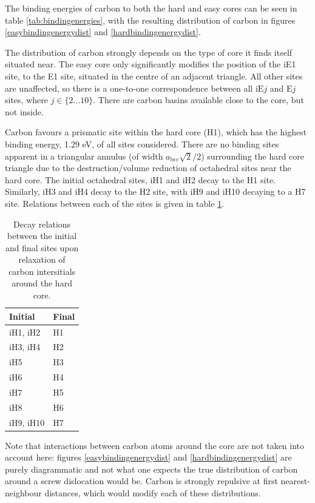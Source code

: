 \documentclass[a4paper,11pt]{article}
\begin{document}
The binding energies of carbon to both the hard and easy cores can be seen in
table \ref{tab:bindingenergies}, with the resulting distribution of carbon in figures \ref{easybindingenergydist} and
\ref{hardbindingenergydist}. 

The distribution of carbon strongly depends on the type of core it
finds itself situated near. The easy core only significantly modifies the position of the iE1 site, to the E1 site, situated
in the centre of an adjacent triangle. All other sites are unaffected, so there is a one-to-one
correspondence between all \(\text{iE}j\) and \(\text{E}j\) sites, where \(j \in \{2\dots10\}\). There are carbon basins available
close to the core, but not inside.

Carbon favours a prismatic site within the hard core (H1), which has the highest
binding energy, 1.29 eV, of all sites considered. There are no binding sites apparent in a triangular
annulus (of width \(a_{\text{bcc}}\sqrt{2}/2\)) surrounding the hard core triangle due to the
destruction/volume reduction of octahedral sites near the hard core. The initial octahedral
sites, iH1 and iH2 decay to the H1 site. Similarly, iH3 and iH4 decay to the H2 site, with iH9
and iH10 decaying to a H7 site. Relations between each of the sites is given in table
\ref{decayrelations}.


\begin{table}[htbp]
\caption{Decay relations between the initial and final sites upon relaxation of carbon intersitials around the hard core. \label{decayrelations}}
\centering
\begin{tabular}{ll}
Initial & Final\\
\hline
iH1, iH2 & H1\\
iH3, iH4 & H2\\
iH5 & H3\\
iH6 & H4\\
iH7 & H5\\
iH8 & H6\\
iH9, iH10 & H7\\
\end{tabular}
\end{table}


Note that interactions between carbon atoms around the core are not taken into account here:
figures \ref{easybindingenergydist} and \ref{hardbindingenergydist} are purely diagrammatic and not
what one expects the true distribution of carbon around a screw dislocation would be. Carbon is strongly
repulsive at first nearest-neighbour distances, which would modify each of these
distributions. 
\end{document}
